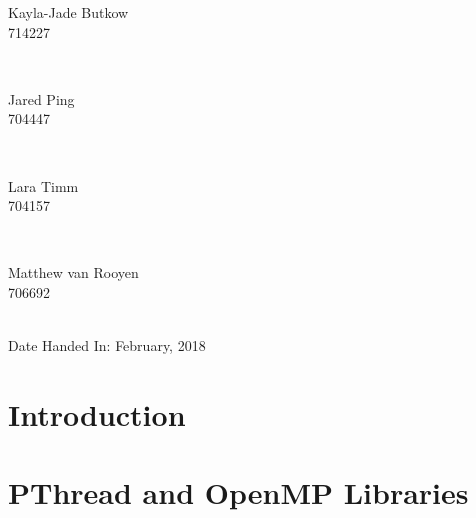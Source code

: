 \documentclass[10pt,twocolumn]{witseiepaper}
\begin{document}
\begin{titlepage}
\begin{minipage}{0.4\textwidth}
	\begin{flushleft} \large
		Kayla-Jade Butkow \\ 714227 %
	\end{flushleft}
\end{minipage}
~
\begin{minipage}{0.4\textwidth}
	\begin{flushright} \large
		Jared Ping \\ 704447
	\end{flushright}
\end{minipage}\\[1cm]

\begin{minipage}{0.4\textwidth}
	\begin{flushleft} \large
		Lara Timm \\ 704157
	\end{flushleft}
\end{minipage}
~
\begin{minipage}{0.4\textwidth}
	\begin{flushright} \large
		Matthew van Rooyen \\ 706692
	\end{flushright}
\end{minipage}\\[1cm]
		
		
	
{\large Date Handed In:  February, 2018}\\[1cm] 
	
\end{titlepage}



\pagestyle{plain}
\setcounter{page}{1}

\section{Introduction}


\section{PThread and OpenMP Libraries}
\end{document}
